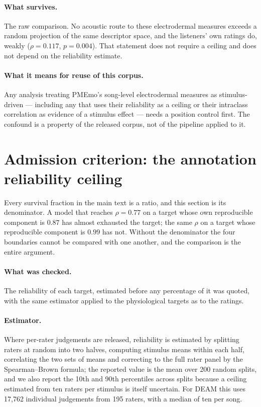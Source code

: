 \paragraph{What survives.}
The raw comparison. No acoustic route to these electrodermal measures exceeds
a random projection of the same descriptor space, and the listeners' own
ratings do, weakly ($\rho = 0.117$, $p = 0.004$). That statement does not
require a ceiling and does not depend on the reliability estimate.

\paragraph{What it means for reuse of this corpus.}
Any analysis treating PMEmo's song-level electrodermal measures as
stimulus-driven --- including any that uses their reliability as a ceiling or
their intraclass correlation as evidence of a stimulus effect --- needs a
position control first. The confound is a property of the released corpus, not
of the pipeline applied to it.

\section{Admission criterion: the annotation reliability ceiling}

Every survival fraction in the main text is a ratio, and this section is its
denominator. A model that reaches $\rho = 0.77$ on a target whose own reproducible
component is $0.87$ has almost exhausted the target; the same $\rho$ on a target whose
reproducible component is $0.99$ has not. Without the denominator the four boundaries
cannot be compared with one another, and the comparison is the entire argument.

\paragraph{What was checked.}
The reliability of each target, estimated before any percentage of it was quoted, with
the same estimator applied to the physiological targets as to the ratings.

\paragraph{Estimator.}
Where per-rater judgements are released, reliability is estimated by splitting raters
at random into two halves, computing stimulus means within each half, correlating the
two sets of means and correcting to the full rater panel by the Spearman--Brown
formula; the reported value is the mean over 200 random splits, and we also report the
10th and 90th percentiles across splits because a ceiling estimated from ten raters
per stimulus is itself uncertain. For DEAM this uses 17{,}762 individual judgements
from 195 raters, with a median of ten per song.

